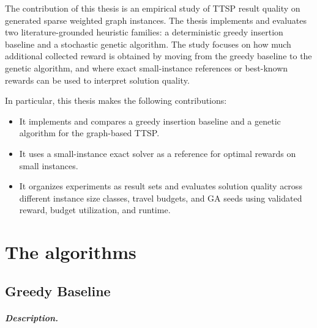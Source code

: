\documentclass[report,english,cleveref,autoref,a4paper]{lipics-v2021}
\begin{document}
The contribution of this thesis is an empirical study of TTSP result quality on
generated sparse weighted graph instances. The thesis implements and evaluates
two literature-grounded heuristic families: a deterministic greedy insertion
baseline and a stochastic genetic algorithm. The study focuses on how much
additional collected reward is obtained by moving from the greedy baseline to
the genetic algorithm, and where exact small-instance references or best-known
rewards can be used to interpret solution quality.

In particular, this thesis makes the following contributions:
\begin{itemize}
    \item It implements and compares a greedy insertion baseline and a genetic
    algorithm for the graph-based TTSP.
    \item It uses a small-instance exact solver as a reference for optimal
    rewards on small instances.
    \item It organizes experiments as result sets and evaluates solution
    quality across different instance size classes, travel budgets, and GA
    seeds using validated reward, budget utilization, and runtime.
\end{itemize}

\section{The algorithms}
\label{sec:algorithms}

\subsection{Greedy Baseline}
\subparagraph{Description.}

\end{document}
